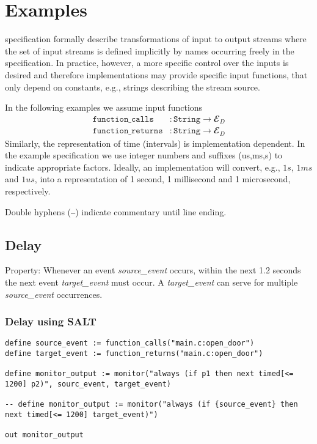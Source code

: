 \section{Examples}

\tessla specification formally describe transformations of input to output streams where the set of input streams is defined implicitly by names occurring freely in the specification. 
In practice, however, a more specific control over the inputs is desired and therefore implementations may provide specific input functions, that only depend on constants, e.g., strings describing the stream source.

In the following examples we assume input functions
\begin{align*}
 \mathtt{function\_calls}&: \mathtt{String} → 𝓔_D\\
 \mathtt{function\_returns}&: \mathtt{String} → 𝓔_D
\end{align*}
Similarly, the representation of time (intervals) is implementation dependent.
In the example specification we use integer numbers and suffixes (us,ms,s) to indicate appropriate factors. 
Ideally, an implementation will convert, e.g.,  $1s$, $1ms$ and $1us$, into a representation of 1 second, 1 millisecond and 1 microsecond, respectively.

Double hyphens (\texttt{--}) indicate commentary until line ending.

\subsection{Delay}

Property: Whenever an event \emph{source\_event} occurs, within the next 1.2 seconds the next event \emph{target\_event} must occur.
A \emph{target\_event} can serve for multiple \emph{source\_event} occurrences.

\subsubsection{Delay using SALT}

\begin{lstlisting}[language=tessla+salt]
define source_event := function_calls("main.c:open_door")
define target_event := function_returns("main.c:open_door")

define monitor_output := monitor("always (if p1 then next timed[<= 1200] p2)", sourc_event, target_event)

-- define monitor_output := monitor("always (if {source_event} then next timed[<= 1200] target_event)")

out monitor_output
\end{lstlisting}

